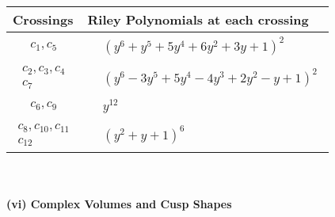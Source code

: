 \documentclass[1p]{elsarticle_modified}
\theoremstyle{definition}
\begin{document}
\begin{tabular}{m{50pt}|m{274pt}}
Crossings & \hspace{64pt}Riley Polynomials at each crossing \\
\hline $$\begin{aligned}c_{1},c_{5}\end{aligned}$$&$\begin{aligned}
&(y^6+y^5+5 y^4+6 y^2+3 y+1)^2
\end{aligned}$\\
\hline $$\begin{aligned}c_{2},c_{3},c_{4}\\c_{7}\end{aligned}$$&$\begin{aligned}
&(y^6-3 y^5+5 y^4-4 y^3+2 y^2- y+1)^2
\end{aligned}$\\
\hline $$\begin{aligned}c_{6},c_{9}\end{aligned}$$&$\begin{aligned}
&y^{12}
\end{aligned}$\\
\hline $$\begin{aligned}c_{8},c_{10},c_{11}\\c_{12}\end{aligned}$$&$\begin{aligned}
&(y^2+y+1)^6
\end{aligned}$\\
\hline
\end{tabular}\\~\\
\newpage\flushleft \textbf{(vi) Complex Volumes and Cusp Shapes}
\end{document}

